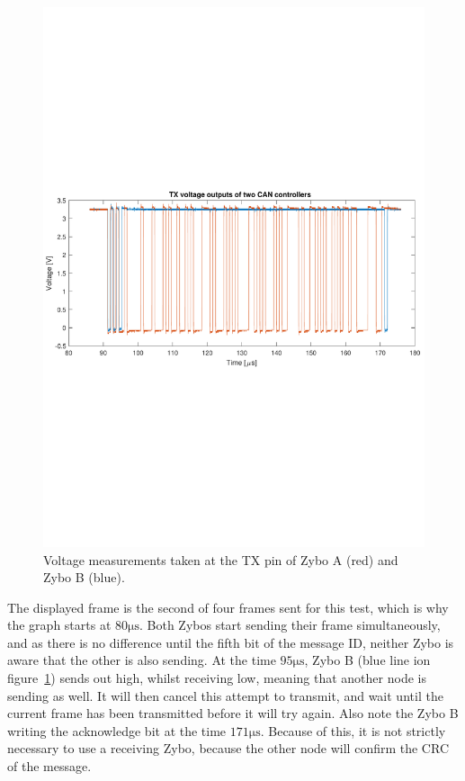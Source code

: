 \begin{figure}[h]
	\centering
	\includegraphics[width = \linewidth]{graphics/CAN_test3_2TX}
	\caption[Voltage measurements of CAN test.]{Voltage measurements taken at the TX pin of Zybo A (red) and Zybo B (blue).}
	\label{fig:CAN_test3_2TX}
\end{figure}

The displayed frame is the second of four frames sent for this test, which is why the graph starts at $80 \si{\micro\second}$.
Both Zybos start sending their frame simultaneously, and as there is no difference until the fifth bit of the message ID, neither Zybo is aware that the other is also sending.
At the time $95\si{\micro\second}$, Zybo B (blue line ion figure~\ref{fig:CAN_test3_2TX}) sends out high, whilst receiving low, meaning that another node is sending as well. 
It will then cancel this attempt to transmit, and wait until the current frame has been transmitted before it will try again.
Also note the Zybo B writing the acknowledge bit at the time $171 \si{\micro\second}$.
Because of this, it is not strictly necessary to use a receiving Zybo, because the other node will confirm the CRC of the message.\\


